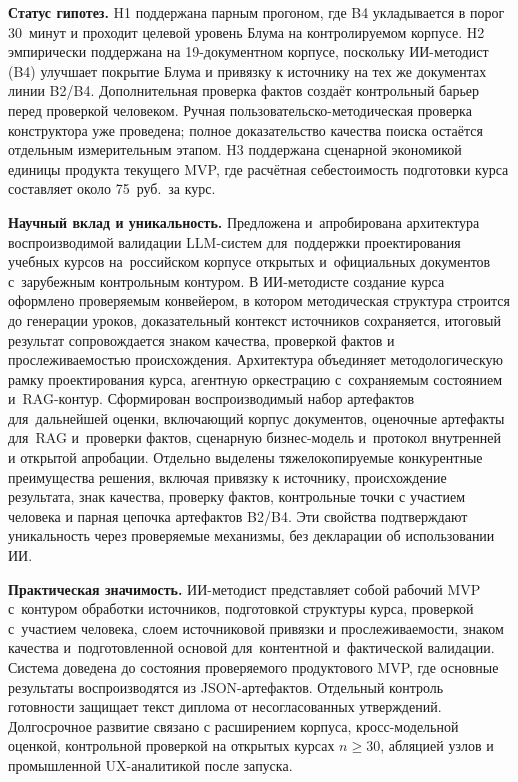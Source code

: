 \textbf{Статус гипотез.}
H1 поддержана парным прогоном, где B4 укладывается в порог 30~минут
и проходит целевой уровень Блума на контролируемом корпусе. H2
эмпирически поддержана на 19-документном корпусе, поскольку ИИ-методист (B4) улучшает
покрытие Блума и привязку к источнику на тех же документах линии B2/B4.
Дополнительная проверка фактов создаёт контрольный барьер перед проверкой человеком.
Ручная пользовательско-методическая проверка конструктора уже проведена;
полное доказательство качества поиска остаётся отдельным измерительным этапом. H3 поддержана
сценарной экономикой единицы продукта текущего MVP, где расчётная себестоимость подготовки курса
составляет около 75~руб.\ за курс.

\textbf{Научный вклад и уникальность.}
Предложена и~апробирована архитектура воспроизводимой
валидации LLM-систем для~поддержки проектирования учебных курсов
на~российском корпусе открытых и~официальных документов
с~зарубежным контрольным контуром. В ИИ-методисте
создание курса оформлено проверяемым конвейером, в котором методическая
структура строится до генерации уроков, доказательный контекст источников
сохраняется, итоговый результат сопровождается знаком качества,
проверкой фактов и прослеживаемостью происхождения. Архитектура объединяет методологическую рамку
проектирования курса, агентную оркестрацию с~сохраняемым состоянием
и~RAG-контур. Сформирован воспроизводимый набор артефактов
для~дальнейшей оценки, включающий корпус документов, оценочные артефакты для~RAG
и~проверки фактов, сценарную бизнес-модель и~протокол внутренней
и открытой апробации.
Отдельно выделены тяжелокопируемые конкурентные преимущества решения, включая
привязку к источнику, происхождение результата, знак качества, проверку
фактов, контрольные точки с участием человека и парная цепочка артефактов B2/B4.
Эти свойства подтверждают уникальность через проверяемые механизмы, без декларации об использовании ИИ.

\textbf{Практическая значимость.}
ИИ-методист представляет собой рабочий MVP
с~контуром обработки источников, подготовкой структуры курса,
проверкой с~участием человека, слоем источниковой привязки и прослеживаемости, знаком качества
и~подготовленной основой для~контентной и~фактической валидации.
Система доведена до состояния проверяемого продуктового MVP, где
основные результаты воспроизводятся из JSON-артефактов. Отдельный
контроль готовности защищает текст диплома от несогласованных утверждений.
Долгосрочное развитие связано с расширением корпуса, кросс-модельной
оценкой, контрольной проверкой на открытых курсах $n \geq 30$, абляцией узлов
и промышленной UX-аналитикой после запуска.
